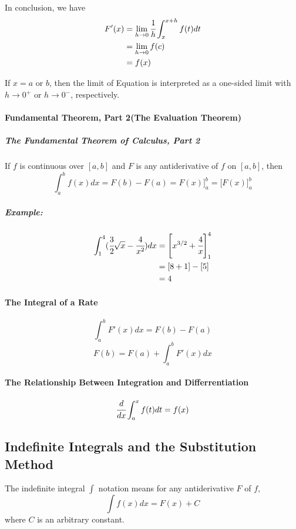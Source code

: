 \documentclass{article}
\begin{document}
            \par In conclusion, we have
            \begin{equation}
                \begin{aligned}
                    F'(x)&=\lim\limits_{h\to 0}\cfrac{1}{h}\int_x^{x+h}f(t)dt\\
                    &=\lim\limits_{h\to 0}f(c)\\
                    &=f(x)\\
                \end{aligned}
            \end{equation}
            \par If $x=a$ or $b$, then the limit of Equation is interpreted as a one-sided limit with $h\to 0^+$ or $h\to 0^-$, respectively.
            \paragraph{Fundamental Theorem, Part 2(The Evaluation Theorem)}
                \subparagraph{The Fundamental Theorem of Calculus, Part 2}
                If $f$ is continuous over $[a,b]$ and $F$ is any antiderivative of $f$ on $[a,b]$, then
                \[\int_a^b f(x)dx=F(b)-F(a)=F(x)\Bigg]_a^b=\Bigg[F(x)\Bigg]_a^b\]
                \subparagraph{Example:}
                \begin{equation}
                    \begin{aligned}
                        \int_1^4(\cfrac{3}{2}\sqrt{x}-\cfrac{4}{x^2})dx&=\Bigg[x^{3/2}+\cfrac{4}{x}\Bigg]_1^4\\
                        &=[8+1]-[5]\\
                        &=4
                    \end{aligned}
                \end{equation}
            \paragraph{The Integral of a Rate}
            \[\int_a^bF'(x)dx=F(b)-F(a)\]
            \[F(b)=F(a)+\int_a^b F'(x)dx\]
            \paragraph{The Relationship Between Integration and Differrentiation}
            \[\cfrac{d}{dx}\int_a^xf(t)dt=f(x)\]
        \subsection{Indefinite Integrals and the Substitution Method}
            The indefinite integral $\int$ notation  means for any antiderivative $F$ of $f$,
            \[\int f(x)dx=F(x)+C\]
            where $C$ is an arbitrary constant.
\end{document}
